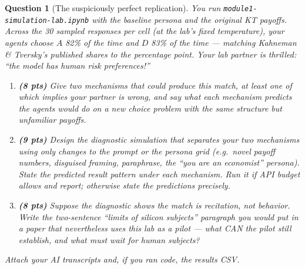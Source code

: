 \documentclass[11pt]{article}
\newtheorem{question}{Question}
\begin{document}
\begin{question}[The suspiciously perfect replication]
You run \texttt{module1-simulation-lab.ipynb} with the baseline persona and
the original KT payoffs. Across the 30 sampled responses per cell (at the
lab's fixed temperature), your agents choose $A$ 82\% of the time and $D$
83\% of the time --- matching Kahneman \& Tversky's published shares to the
percentage point. Your lab partner is thrilled: ``the model has human risk
preferences!''

\begin{enumerate}[label=(\alph*)]
  \item \textbf{(8 pts)} Give two mechanisms that could produce this match,
        at least one of which implies your partner is wrong, and say what
        each mechanism predicts the agents would do on a \emph{new} choice
        problem with the same structure but unfamiliar payoffs.
  \item \textbf{(9 pts)} Design the diagnostic simulation that separates
        your two mechanisms using only changes to the prompt or the persona
        grid (e.g.\ novel payoff numbers, disguised framing, paraphrase,
        the ``you are an economist'' persona). State the predicted result
        pattern under each mechanism. Run it if API budget allows and
        report; otherwise state the predictions precisely.
  \item \textbf{(8 pts)} Suppose the diagnostic shows the match is
        recitation, not behavior. Write the two-sentence ``limits of
        silicon subjects'' paragraph you would put in a paper that
        nevertheless uses this lab as a pilot --- what CAN the pilot still
        establish, and what must wait for human subjects?
\end{enumerate}
Attach your AI transcripts and, if you ran code, the results CSV.
\end{question}
\end{document}
